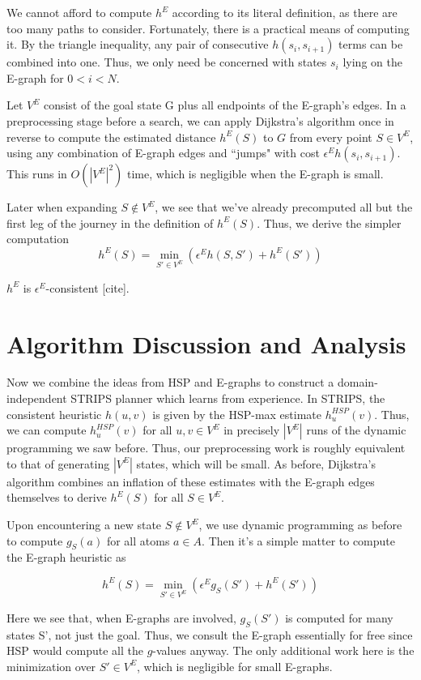 \documentclass[letterpaper]{article}
\begin{document}
We cannot afford to compute $h^E$ according to its literal definition, as there are too many paths to consider. Fortunately, there is a practical means of computing it. By the triangle inequality, any pair of consecutive $h(s_i,s_{i+1})$ terms can be combined into one. Thus, we only need be concerned with states $s_i$ lying on the E-graph for $0 < i < N$.

Let $V^E$ consist of the goal state G plus all endpoints of the E-graph's edges. In a preprocessing stage before a search, we can apply Dijkstra's algorithm once in reverse to compute the estimated distance $h^E(S)$ to $G$ from every point $S\in V^E$, using any combination of E-graph edges and ``jumps" with cost $\epsilon^E h(s_i,s_{i+1})$. This runs in $O(|V^E|^2)$ time, which is negligible when the E-graph is small.

Later when expanding $S \notin V^E$, we see that we've already precomputed all but the first leg of the journey in the definition of $h^E(S)$. Thus, we derive the simpler computation
\[h^E(S) = \min_{S'\in V^E} \left(\epsilon^E h(S,S') + h^E(S')\right)\]

$h^E$ is $\epsilon^E$-consistent [cite].

\section{Algorithm Discussion and Analysis}

Now we combine the ideas from HSP and E-graphs to construct a domain-independent STRIPS planner which learns from experience. In STRIPS, the consistent heuristic $h(u,v)$ is given by the HSP-max estimate $h^{HSP}_u(v)$. Thus, we can compute $h^{HSP}_u(v)$ for all $u,v\in V^E$ in precisely $|V^E|$ runs of the dynamic programming we saw before. Thus, our preprocessing work is roughly equivalent to that of generating $|V^E|$ states, which will be small. As before, Dijkstra's algorithm combines an inflation of these estimates with the E-graph edges themselves to derive $h^E(S)$ for all $S\in V^E$.

Upon encountering a new state $S\notin V^E$, we use dynamic programming as before to compute $g_S(a)$ for all atoms $a\in A$. Then it's a simple matter to compute the E-graph heuristic as

\[h^E(S) = \min_{S'\in V^E} \left( \epsilon^E g_S(S') + h^E(S') \right)\]

Here we see that, when E-graphs are involved, $g_S(S')$ is computed for many states S', not just the goal. Thus, we consult the E-graph essentially for free since HSP would compute all the $g$-values anyway. The only additional work here is the minimization over $S'\in V^E$, which is negligible for small E-graphs.
\end{document}
